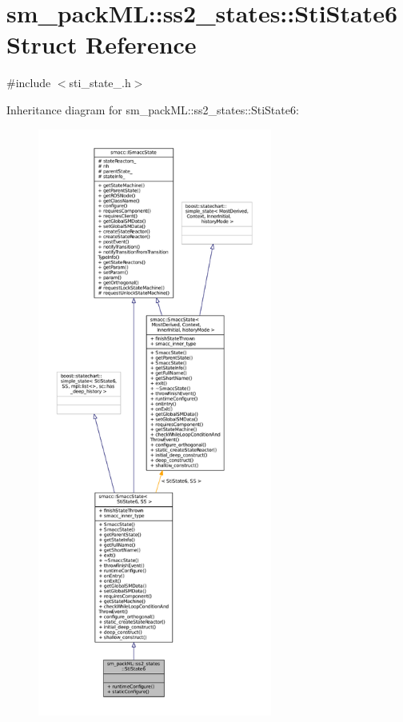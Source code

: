 \hypertarget{structsm__packML_1_1ss2__states_1_1StiState6}{}\section{sm\+\_\+pack\+ML\+:\+:ss2\+\_\+states\+:\+:Sti\+State6 Struct Reference}
\label{structsm__packML_1_1ss2__states_1_1StiState6}


{\ttfamily \#include $<$sti\+\_\+state\+\_.\+h$>$}



Inheritance diagram for sm\+\_\+pack\+ML\+:\+:ss2\+\_\+states\+:\+:Sti\+State6\+:
\nopagebreak
\begin{figure}[H]
\begin{center}
\leavevmode
\includegraphics[height=550pt]{structsm__packML_1_1ss2__states_1_1StiState6__inherit__graph}
\end{center}
\end{figure}



